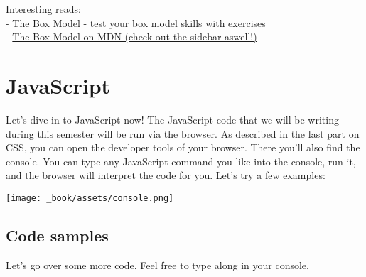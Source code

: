 \documentclass[
]{book}
\begin{document}
Interesting reads:\\
- \href{https://www.w3schools.com/css/css_boxmodel.asp}{The Box Model - test your box model skills with exercises}\\
- \href{https://developer.mozilla.org/en-US/docs/Learn/CSS/Building_blocks/The_box_model}{The Box Model on MDN (check out the sidebar aswell!)}

\hypertarget{javascript}{%
\section{JavaScript}\label{javascript}}

Let's dive in to JavaScript now! The JavaScript code that we will be writing during this semester will be run via the browser. As described in the last part on CSS, you can open the developer tools of your browser. There you'll also find the console. You can type any JavaScript command you like into the console, run it, and the browser will interpret the code for you. Let's try a few examples:

\texttt{[image: \_book/assets/console.png]}

\hypertarget{code-samples}{%
\subsection*{Code samples}\label{code-samples}}

Let's go over some more code. Feel free to type along in your console.
\end{document}
